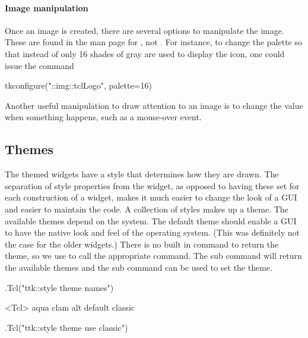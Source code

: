 \paragraph{Image manipulation}
Once an image is created, there are several options to manipulate the
image. These are found in the \TK\/ man page for , not
. For instance, to change the palette so that instead of
 only 16 shades of gray are used to display the icon,
one could issue the command
\begin{Schunk}
\begin{Sinput}
 tkconfigure("::img::tclLogo", palette=16)
\end{Sinput}
\end{Schunk}

Another useful manipulation to draw attention to an image is to change the  value when something happens, such as a mouse-over event.


\subsection{Themes}
\label{sec:tcltk:overview:themes}


The themed widgets have a style that determines how they are drawn. The separation of style properties from the widget, as opposed to having these set for each construction of a widget, makes it much easier to change the look of a GUI and easier to maintain the code. A collection of styles makes up a theme. The available themes depend on the system. The default theme should enable a GUI to have the native look and feel of the operating system. (This was definitely not the case for the older \TK\/ widgets.) There is no built in command to return the theme, so we use  to call the appropriate \TCL\/ command. The  sub command will return the available themes and the  sub command can be used to set the theme.

\begin{Schunk}
\begin{Sinput}
 .Tcl("ttk::style theme names")
\end{Sinput}
\begin{Soutput}
<Tcl> aqua clam alt default classic 
\end{Soutput}
\begin{Sinput}
 .Tcl("ttk::style theme use classic")
\end{Sinput}
\end{Schunk}

